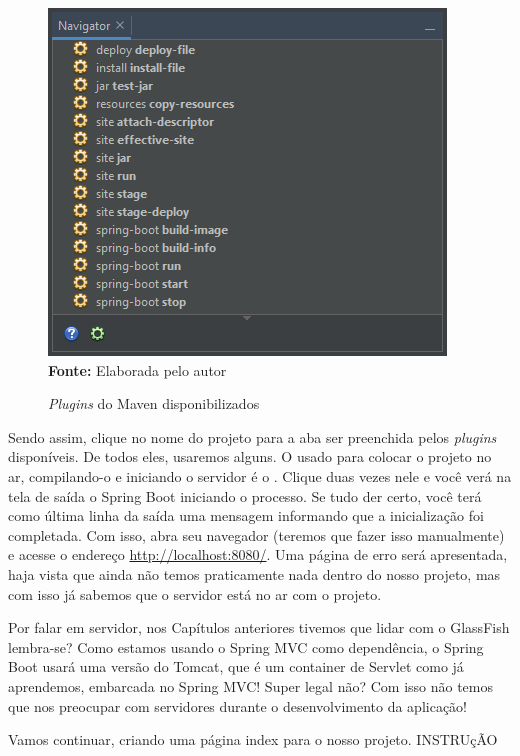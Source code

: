 \FloatBarrier
\begin{figure}[!htbp]
    \centering
    \caption{\textit{Plugins} do Maven disponibilizados}
    \includegraphics[scale=1]{imagens/cap10PluginsMaven}
    \\\textbf{Fonte:} Elaborada pelo autor
    \label{fig:cap10PluginsMaven}
\end{figure}
\FloatBarrier

Sendo assim, clique no nome do projeto para a aba  ser preenchida pelos \textit{plugins} disponíveis. De todos eles, usaremos alguns. O usado para colocar o projeto no ar, compilando-o e iniciando o servidor é o . Clique duas vezes nele e você verá na tela de saída o Spring Boot iniciando o processo. Se tudo der certo, você terá como última linha da saída uma mensagem informando que a inicialização foi completada. Com isso, abra seu navegador (teremos que fazer isso manualmente) e acesse o endereço \url{http://localhost:8080/}. Uma página de erro será apresentada, haja vista que ainda não temos praticamente nada dentro do nosso projeto, mas com isso já sabemos que o servidor está no ar com o projeto.

Por falar em servidor, nos Capítulos anteriores tivemos que lidar com o GlassFish lembra-se? Como estamos usando o Spring MVC como dependência, o Spring Boot usará uma versão do Tomcat, que é um container de Servlet como já aprendemos, embarcada no Spring MVC! Super legal não? Com isso não temos que nos preocupar com servidores durante o desenvolvimento da aplicação!

Vamos continuar, criando uma página index para o nosso projeto. INSTRUçÃO

